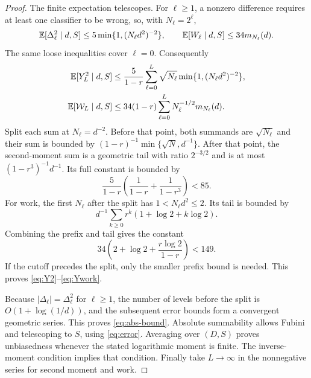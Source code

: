 \begin{proof}
The finite expectation telescopes. For $\ell\ge1$, a nonzero difference
requires at least one classifier to be wrong, so, with $N_\ell=2^\ell$,
\begin{equation}\label{eq:level-bounds}
 \mathbb E[\Delta_\ell^2\mid d,S]\le5\min\{1,(N_\ell d^2)^{-2}\},\qquad
 \mathbb E[W_\ell\mid d,S]\le34m_{N_\ell}(d).
\end{equation}
The same loose inequalities cover $\ell=0$. Consequently
\begin{align}
 \mathbb E[Y_L^2\mid d,S]
 &\le\frac5{1-r}\sum_{\ell=0}^L
       \sqrt{N_\ell}\min\{1,(N_\ell d^2)^{-2}\},\label{eq:Y2sum}\\
 \mathbb E[\mathcal W_L\mid d,S]
 &\le34(1-r)\sum_{\ell=0}^L
 N_\ell^{-1/2}m_{N_\ell}(d).\label{eq:Yworksum}
\end{align}
Split each sum at $N_\ell=d^{-2}$. Before that point, both summands are
$\sqrt{N_\ell}$ and their sum is bounded by
$(1-r)^{-1}\min\{\sqrt N,d^{-1}\}$.
After that point, the second-moment sum is a geometric tail with ratio
$2^{-3/2}$ and is at most $(1-r^3)^{-1}d^{-1}$.
Its full constant is bounded by
\[
 \frac5{1-r}\left(\frac1{1-r}+\frac1{1-r^3}\right)<85.
\]
For work, the first $N_\ell$ after the split has
$1<N_\ell d^2\le2$. Its tail is bounded by
\[
 d^{-1}\sum_{k\ge0}r^k(1+\log2+k\log2).
\]
Combining the prefix and tail gives the constant
\[
 34\left(2+\log2+\frac{r\log2}{1-r}\right)<149.
\]
If the cutoff precedes the split, only the smaller prefix bound is needed.
This proves \eqref{eq:Y2}--\eqref{eq:Ywork}.

Because $|\Delta_\ell|=\Delta_\ell^2$ for $\ell\ge1$, the number of
levels before the split is $O(1+\log(1/d))$, and the subsequent error
bounds form a convergent geometric series. This proves \eqref{eq:abs-bound}.
Absolute summability allows Fubini and telescoping to $S$, using
\eqref{eq:error}. Averaging over $(D,S)$ proves unbiasedness whenever the
stated logarithmic moment is finite. The inverse-moment condition implies
that condition. Finally take $L\to\infty$ in the nonnegative series for
second moment and work.
\end{proof}

